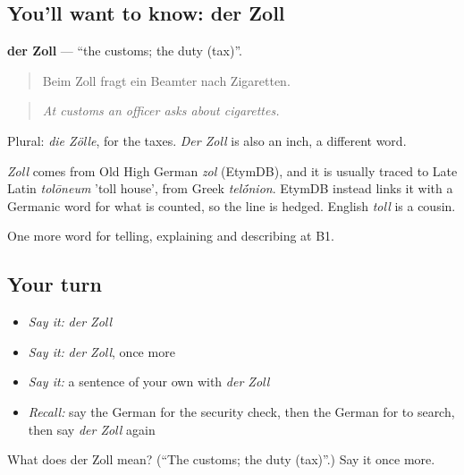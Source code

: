 \subsection*{You'll want to know: der Zoll}
\textbf{der Zoll} — \textquotedblleft{}the customs; the duty (tax)\textquotedblright{}.

\begin{quote}
Beim Zoll fragt ein Beamter nach Zigaretten.
\end{quote}

\begin{quote}
\emph{At customs an officer asks about cigarettes.}
\end{quote}

Plural: \emph{die Zölle}, for the taxes. \emph{Der Zoll} is also an inch, a different word.

\begin{cousinweb}
\emph{Zoll} comes from Old High German \emph{zol} (EtymDB), and it is usually traced to Late Latin \emph{tolōneum} 'toll house', from Greek \emph{tel\'{\={o}}nion}. EtymDB instead links it with a Germanic word for what is counted, so the line is hedged. English \emph{toll} is a cousin.
\end{cousinweb}

\begin{grammarlens}[title={What you've built}]
One more word for telling, explaining and describing at B1.
\end{grammarlens}

\subsection*{Your turn}
\begin{itemize}
\raggedright
  \item \emph{Say it:} \emph{der Zoll}
  \item \emph{Say it:} \emph{der Zoll}, once more
  \item \emph{Say it:} a sentence of your own with \emph{der Zoll}
  \item \emph{Recall:} say the German for the security check, then the German for to search, then say \emph{der Zoll} again
\end{itemize}

\begin{tcolorbox}[breakable,colback=teal!4,colframe=teal!35!black,title={Before you move on}]
What does der Zoll mean? (\textquotedblleft{}The customs; the duty (tax)\textquotedblright{}.) Say it once more.
\end{tcolorbox}
